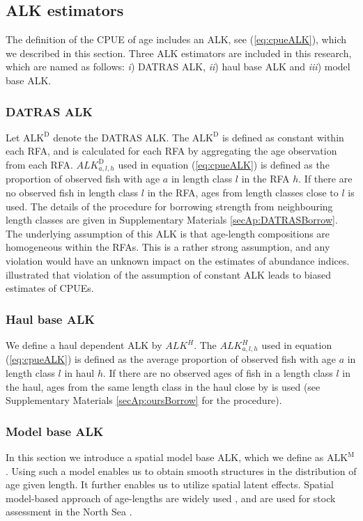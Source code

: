 \documentclass[a4paper 12pt]{article}
\numberwithin{equation}{section}
\begin{document}
\subsection{ALK estimators}
\label{sec:alkmethods}
The definition of the CPUE of age includes an ALK, see (\ref{eq:cpueALK}), which we described in this section. Three ALK estimators are included in this research, which are named as follows:  \textit{i}) DATRAS ALK, \textit{ii}) haul base ALK and \textit{iii}) model base ALK.
\subsubsection{DATRAS ALK}
\label{sec:datrasalkestimator}
Let $\text{ALK}^{\text{D}}$ denote the DATRAS ALK. The $\text{ALK}^{\text{D}}$ is defined as constant within each RFA, and is calculated for each RFA by aggregating the age observation from each RFA. $ALK^{\text{D}}_{a,l,h}$ used in equation (\ref{eq:cpueALK}) is defined as the proportion of observed fish with age $a$ in length class $l$ in the RFA $h$. If there are no observed fish in length class $l$ in the RFA, ages from length classes close to $l$ is used. The details of the procedure for borrowing strength from neighbouring length classes are given in Supplementary Materials \ref{secAp:DATRASBorrow}. The underlying assumption of this ALK  is that age-length compositions are homogeneous within the RFAs. This is a rather strong assumption, and any violation would have an unknown impact on the estimates of abundance indices. \citet{aanes2015efficient} illustrated that violation of the assumption of constant ALK leads to biased estimates of CPUEs. 

\subsubsection{Haul base ALK}
\label{sec:haulestimator}
We define a haul dependent ALK  by  $ALK^{H}$. The $ALK^{H}_{a,l,h}$  used in equation (\ref{eq:cpueALK}) is defined as the average proportion of observed fish with age $a$ in  length class $l$ in haul $h$. If there are no observed ages of fish in a length class $l$ in the haul, ages from the same length class in the haul close by is used (see Supplementary Materials \ref{secAp:oursBorrow} for the procedure).

\subsubsection{Model base ALK}
\label{sec:spatialModelALK}
In this section we introduce a spatial model base ALK, which we define as $\mathrm{ALK^M}$. Using such a model enables us to obtain smooth structures in the distribution of age given length. It further enables us to utilize spatial latent effects. Spatial model-based approach of age-lengths are widely used \citep{berg2012spatial, hirst2012bayesian, rindorf2001analyses}, and are used for stock assessment in the North Sea \citep{berg2014evaluation}.  %
\end{document}
